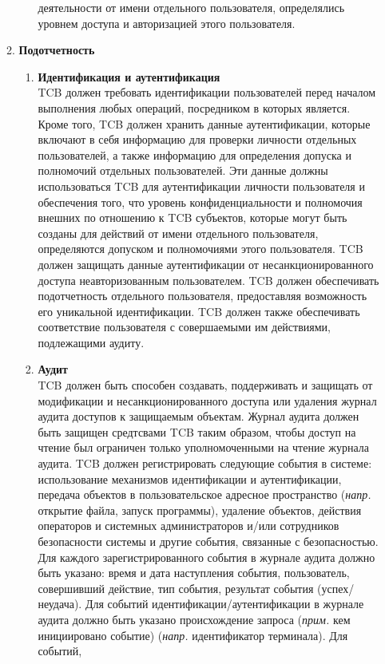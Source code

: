 \begin{enumerate}
\begin{enumerate}
\begin{enumerate}
			деятельности от имени отдельного пользователя, определялись уровнем доступа и авторизацией этого пользователя.
		\end{enumerate}
		\item{\textbf{Подотчетность}}
		\begin{enumerate}
			\item{\textbf{Идентификация и аутентификация}}\\
			TCB должен требовать идентификации пользователей перед началом выполнения любых операций, посредником в которых является. Кроме того, TCB должен хранить данные аутентификации, 
			которые включают в себя информацию для проверки личности отдельных пользователей, а также информацию для определения допуска и полномочий отдельных пользователей. Эти данные должны 
			использоваться TCB для аутентификации личности пользователя и обеспечения того, что уровень конфиденциальности и полномочия внешних по отношению к TCB субъектов, которые 
			могут быть созданы для действий от имени отдельного пользователя, определяются допуском и полномочиями этого пользователя. TCB должен защищать данные аутентификации от 
			несанкционированного доступа неавторизованным пользователем. TCB должен обеспечивать подотчетность отдельного пользователя, предоставляя возможность его уникальной идентификации.
			TCB должен также обеспечивать соответствие пользователя с совершаемыми им действиями, подлежащими аудиту.
			\item{\textbf{Аудит}}\\
			TCB должен быть способен создавать, поддерживать и защищать от модификации и несанкционированного доступа или удаления журнал аудита доступов к защищаемым объектам. Журнал аудита 
			должен быть защищен средтсвами TCB таким образом, чтобы доступ на чтение был ограничен только уполномоченными на чтение журнала аудита. TCB должен регистрировать следующие события
			в системе: использование механизмов идентификации и аутентификации, передача объектов в пользовательское адресное пространство (\textit{напр.} открытие файла, запуск программы),
			удаление объектов, действия операторов и системных администраторов и/или сотрудников безопасности системы и другие события, связанные с безопасностью. Для каждого зарегистрированного
			события в журнале аудита должно быть указано: время и дата наступления события, пользователь, совершивший действие, тип события, результат события (успех/неудача). Для событий
			идентификации/аутентификации в журнале аудита должно быть указано происхождение запроса (\textit{прим. } кем инициировано событие) (\textit{напр.} идентификатор терминала). Для событий,

\end{enumerate}
\end{enumerate}
\end{enumerate}
